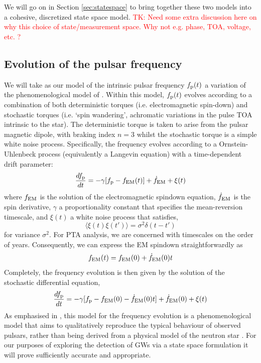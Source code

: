 \documentclass[fleqn,usenatbib,useAMS]{mnras}
\begin{document}
We will go on in Section \ref{sec:statespace} to bring together these two models into a cohesive, discretized state space model. 
\textcolor{red}{TK: Need some extra discussion here on why this choice of state/measurement space. Why not e.g. phase, TOA, voltage, etc. ?}

\subsection{Evolution of the pulsar frequency} \label{sec:psr_frequency}
We will take as our model of the intrinsic pulsar frequency $f_{\rm p}(t)$ a variation of the phenomenological model of \cite{Vargas}. Within this model, $f_{\rm p}(t)$ evolves according to a combination of both deterministic torques (i.e. electromagnetic spin-down) and stochastic torques (i.e. `spin wandering', achromatic variations in the pulse TOA intrinsic to the star). The deterministic torque is taken to arise from the pulsar magnetic dipole, with braking index $n=3$ whilst the stochastic torque is a simple white noise process. Specifically, the frequency evolves according to a Ornstein-Uhlenbeck process (equivalently a Langevin equation) with a time-dependent drift parameter:
\begin{equation}
	\frac{df_{\rm p}}{dt} = -\gamma	 [f_{\rm p} - f_{\rm EM} (t)] + \dot{f}_{\rm EM} + \xi(t)
	\label{eq:frequency_evolution}
\end{equation}
where $f_{\rm EM}$ is the solution of the electromagnetic spindown equation, $\dot{f}_{\rm EM}$ is the spin derivative, $\gamma$ a proportionality constant that specifies the mean-reversion timescale, and $\xi(t)$ a white noise process that satisfies,
\begin{equation}
	\langle \xi(t) \xi(t') \rangle = \sigma^2 \delta(t - t')
\end{equation}
for variance $\sigma^2$. For PTA analysis, we are concerned with timescales on the order of years. Consequently, we can express the EM spindown straightforwardly as
\begin{equation}
	f_{\rm EM} (t) = f_{\rm EM}(0) + \dot{f}_{\rm EM} (0)t
\end{equation}  
Completely, the frequency evolution is then given by the solution of the stochastic differential equation,
\begin{equation}
	\frac{df_{\rm p}}{dt} = -\gamma	 [f_{\rm p}- f_{\rm EM}(0) - \dot{f}_{\rm EM} (0)t] + \dot{f}_{\rm EM} (0) + \xi(t)
	\label{eq:frequency_evolution_expanded}
\end{equation}
As emphasised in \cite{Vargas}, this model for the frequency evolution is a phenomenological model that aims to qualitatively reproduce the typical behaviour of observed pulsars, rather than being derived from a physical model of the neutron star \citep[e.g. a model of the neutron star crust and superfluid, components][]{Meyers2021}. For our purposes of exploring the detection of GWs via a state space formulation it will prove sufficiently accurate and appropriate.
\end{document}
